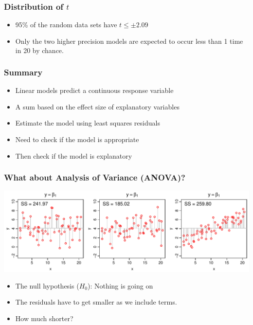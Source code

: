 \documentclass[aspectratio=43]{beamer}
\begin{document}
\begin{frame}[T]
\frametitle{Distribution of $t$}


\centerline{}

\begin{itemize}
\item 95\% of the random data sets have $t\le \pm 2.09$
\item Only the two higher precision models are expected to occur less than 1 time in 20 by chance.
\end{itemize}

\end{frame}

\begin{frame}[T]
\frametitle{Summary}

\begin{itemize}
\item Linear models predict a continuous response variable
\item A sum based on the effect size of explanatory variables
\item Estimate the model using least squares residuals
\item Need to check if the model is appropriate
\item Then check if the model is explanatory
\end{itemize}

\end{frame}



\begin{frame}[T]
\frametitle{What about Analysis of Variance (ANOVA)?}

\includegraphics[width=\textwidth]{ANOVA_null.pdf}

\begin{itemize}
\item The null hypothesis ($H_0$): Nothing is going on
\item The residuals have to get smaller as we include terms.
\item How much shorter?
\end{itemize}

\end{frame}
\end{document}
